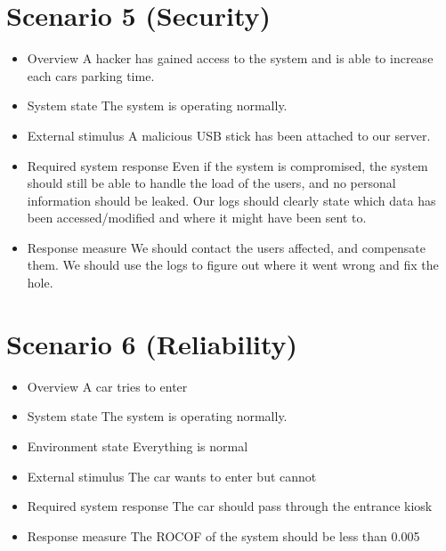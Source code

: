 \section{Scenario 5 (Security)}
\begin{itemize}
	\item Overview
	      \subitem A hacker has gained access to the system and is able to increase each cars parking time.
	\item System state
	      \subitem The system is operating normally.
	\item External stimulus
	      \subitem A malicious USB stick has been attached to our server.
	\item Required system response
	      \subitem Even if the system is compromised, the system should still be able to handle the load of the users, and no personal information should be leaked.
	      \subitem Our logs should clearly state which data has been accessed/modified and where it might have been sent to.
	\item Response measure
	      \subitem We should contact the users affected, and compensate them.
	      \subitem We should use the logs to figure out where it went wrong and fix the hole.
\end{itemize}

\section{Scenario 6 (Reliability)}
\begin{itemize}
	\item Overview
	      \subitem A car tries to enter
	\item System state
	      \subitem The system is operating normally.
	\item Environment state
	      \subitem Everything is normal
	\item External stimulus
	      \subitem The car wants to enter but cannot
	\item Required system response
	      \subitem The car should pass through the entrance kiosk
	\item Response measure
	      \subitem The ROCOF of the system should be less than 0.005
\end{itemize}